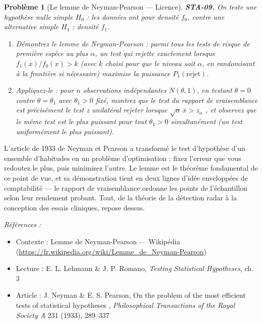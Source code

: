 \documentclass[11pt]{article}
\newtheorem{problem}{Problème}
\newenvironment{refs}{\par\small\noindent\emph{Références :}\begin{itemize}\setlength\itemsep{0pt}}{\end{itemize}\normalsize}
\begin{document}
\bigskip

\begin{problem}[{Le lemme de Neyman-Pearson --- Licence}]
\textbf{STA-09.} On teste une hypothèse nulle simple $ H_0 $ : les données ont pour densité
$ f_0 $, contre une alternative simple $ H_1 $ : densité $ f_1 $.
\begin{enumerate}
\item[(a)] Démontrez le lemme de Neyman-Pearson : parmi tous les tests de risque de première espèce au
plus $ \alpha $, un test qui rejette exactement lorsque $ f_1(x)/f_0(x) >k $ (avec $ k $
choisi pour que le niveau soit $ \alpha $, en randomisant à la frontière si nécessaire) maximise
la puissance $ P_1(\text{rejet}) $.
\item[(b)] Appliquez-le : pour $ n $ observations indépendantes $ N(\theta, 1) $, en testant
$ \theta = 0 $ contre $ \theta = \theta_1 $ avec $ \theta_1 >0 $ fixé, montrez que le test
du rapport de vraisemblance est précisément le test z unilatéral \og{} rejeter lorsque
$ \sqrt{n}\, \bar{x} >z_{\alpha} $ \fg{}, et observez que le même test est le plus puissant pour
tout $ \theta_1 >0 $ simultanément (un test uniformément le plus puissant).
\end{enumerate}

\end{problem}

\noindent L'article de 1933 de Neyman et Pearson a transformé le test d'hypothèse d'un
ensemble d'habitudes en un problème d'optimisation : fixez l'erreur que vous redoutez le plus, puis
minimisez l'autre. Le lemme est le théorème fondamental de ce point de vue, et sa démonstration
tient en deux lignes d'idée enveloppées de comptabilité --- le rapport de vraisemblance ordonne les
points de l'échantillon selon leur rendement probant. Tout, de la théorie de la détection radar à
la conception des essais cliniques, repose dessus.

\begin{refs}
\item Contexte : Lemme de Neyman-Pearson --- Wikipédia (\url{https://fr.wikipedia.org/wiki/Lemme_de_Neyman-Pearson})
\item Lecture : E. L. Lehmann \& J. P. Romano, \textit{Testing Statistical Hypotheses}, ch. 3
\item Article : J. Neyman \& E. S. Pearson, \og{} On the problem of the most efficient tests of statistical hypotheses \fg{}, \textit{Philosophical Transactions of the Royal Society A} 231 (1933), 289--337
\end{refs}
\end{document}
